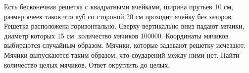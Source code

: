 
Есть бесконечная решетка с квадратными ячейками, ширина прутьев 10 см, размер ячеек таков что
куб со стороной 20 см проходит ячейку без зазоров. Решетка расположена горизонтально. Сверху
вертикально вниз падают мячики, диаметр которых 15 см. количество мячиков 100000. Координаты мячиков 
выбираются случайным образом. Мячики, которые задевают решетку исчезают. Мячики выпускаются таким образом, 
что соударений между ними нет. Найти количество целых мячиков. Ответ округлить до целых.

